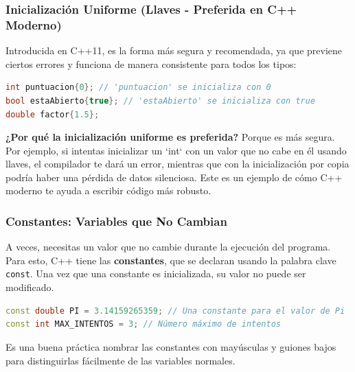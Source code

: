 \subsubsection{Inicialización Uniforme (Llaves - Preferida en C++ Moderno)}
Introducida en C++11, es la forma más segura y recomendada, ya que previene ciertos errores y funciona de manera consistente para todos los tipos:
\begin{lstlisting}[language=C++]
int puntuacion{0}; // 'puntuacion' se inicializa con 0
bool estaAbierto{true}; // 'estaAbierto' se inicializa con true
double factor{1.5};
\end{lstlisting}

\textbf{¿Por qué la inicialización uniforme es preferida?}
Porque es más segura. Por ejemplo, si intentas inicializar un `int` con un valor que no cabe en él usando llaves, el compilador te dará un error, mientras que con la inicialización por copia podría haber una pérdida de datos silenciosa. Este es un ejemplo de cómo C++ moderno te ayuda a escribir código más robusto.

\subsubsection{Constantes: Variables que No Cambian}

A veces, necesitas un valor que no cambie durante la ejecución del programa. Para esto, C++ tiene las \textbf{constantes}, que se declaran usando la palabra clave \texttt{const}. Una vez que una constante es inicializada, su valor no puede ser modificado.

\begin{lstlisting}[language=C++]
const double PI = 3.14159265359; // Una constante para el valor de Pi
const int MAX_INTENTOS = 3; // Número máximo de intentos
\end{lstlisting}

Es una buena práctica nombrar las constantes con mayúsculas y guiones bajos para distinguirlas fácilmente de las variables normales.
